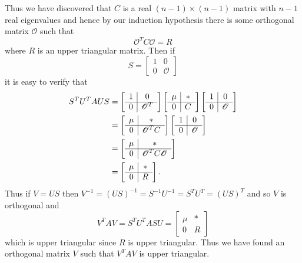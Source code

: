 \documentclass{book}
\begin{document}
{Thus we have discovered that $C$ is a real $(n-1)\times (n-1)$ matrix with $n-1$ real eigenvalues and hence by our induction hypothesis there is some orthogonal matrix $\mathscr{O}$ such that
$$
\mathscr{O}^TC\mathscr{O}=R
$$
where $R$ is an upper triangular matrix. Then if 
$$
S=
\left[
\begin{array}{c|c}
  1& 0\\ \hline
  0& \mathscr{O} 
\end{array}
\right]
$$
it is easy to verify that
$$
\begin{aligned}
S^TU^TAUS&=
\left[
\begin{array}{c|c}
  1& 0\\ \hline
  0& \mathscr{O}^T 
\end{array}
\right]
\left[
\begin{array}{c|c}
  \mu& *\\ \hline
  0& C
\end{array}
\right]
\left[
\begin{array}{c|c}
  1& 0\\ \hline
  0& \mathscr{O}
\end{array}
\right]\notag\\
&=
\left[
\begin{array}{c|c}
  \mu& *\\ \hline
  0& \mathscr{O}^TC
\end{array}
\right]
\left[
\begin{array}{c|c}
  1& 0\\ \hline
  0& \mathscr{O}
\end{array}
\right]\notag\\
&=
\left[
\begin{array}{c|c}
  \mu& *\\ \hline
  0& \mathscr{O}^TC\mathscr{O}
\end{array}
\right]\notag\\
&=
\left[
\begin{array}{c|c}
  \mu& *\\ \hline
  0& R
\end{array}
\right].
\end{aligned}
$$
Thus if $V=US$ then $V^{-1}=(US)^{-1}=S^{-1}U^{-1}=S^TU^T=(US)^T$ and so $V$ is orthogonal and 
$$
V^TAV=S^TU^TASU=
\left[
\begin{array}{c|c}
  \mu& *\\ \hline
  0& R
\end{array}
\right]
$$
which is upper triangular since $R$ is upper triangular. Thus we have found an orthogonal matrix $V$ such that
$V^TAV$ is upper triangular. 
}
\end{document}
